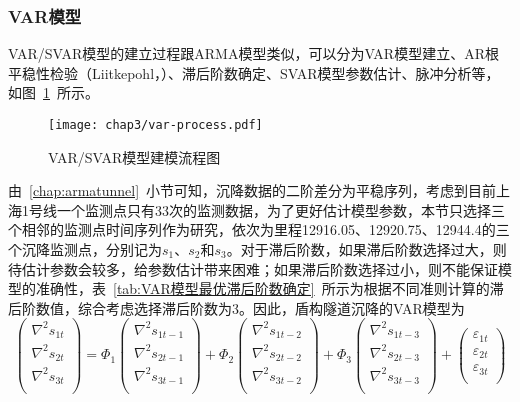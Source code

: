 \subsubsection{VAR模型}

VAR/SVAR模型的建立过程跟ARMA模型类似，可以分为VAR模型建立、AR根平稳性检验（Liitkepohl，\citeyear{liitkepohl1991introduction}）、滞后阶数确定、SVAR模型参数估计、脉冲分析等，如图~\ref{fig:VARSVAR模型建模流程图}~所示。

\begin{figure}[htb!]
    \centering
    \texttt{[image: chap3/var-process.pdf]}
    \caption{VAR/SVAR模型建模流程图}
    \label{fig:VARSVAR模型建模流程图}
\end{figure}

由~\ref{chap:armatunnel}~小节可知，沉降数据的二阶差分为平稳序列，考虑到目前上海1号线一个监测点只有33次的监测数据，为了更好估计模型参数，本节只选择三个相邻的监测点时间序列作为研究，依次为里程12916.05、12920.75、12944.4的三个沉降监测点，分别记为$s_1$、$s_2$和$s_3$。对于滞后阶数，如果滞后阶数选择过大，则待估计参数会较多，给参数估计带来困难；如果滞后阶数选择过小，则不能保证模型的准确性，表~\ref{tab:VAR模型最优滞后阶数确定}~所示为根据不同准则计算的滞后阶数值，综合考虑选择滞后阶数为3。因此，盾构隧道沉降的VAR模型为
\begin{equation}
	\label{equ:var}
	\left( \begin{matrix}
   {{\nabla }^{2}}{{s}_{1t}}  \\
   {{\nabla }^{2}}{{s}_{2t}}  \\
   {{\nabla }^{2}}{{s}_{3t}}  \\
\end{matrix} \right)={{\Phi }_{1}}\left( \begin{matrix}
   {{\nabla }^{2}}{{s}_{1t-1}}  \\
   {{\nabla }^{2}}{{s}_{2t-1}}  \\
   {{\nabla }^{2}}{{s}_{3t-1}}  \\
\end{matrix} \right)+{{\Phi }_{2}}\left( \begin{matrix}
   {{\nabla }^{2}}{{s}_{1t-2}}  \\
   {{\nabla }^{2}}{{s}_{2t-2}}  \\
   {{\nabla }^{2}}{{s}_{3t-2}}  \\
\end{matrix} \right)+{{\Phi }_{3}}\left( \begin{matrix}
   {{\nabla }^{2}}{{s}_{1t-3}}  \\
   {{\nabla }^{2}}{{s}_{2t-3}}  \\
   {{\nabla }^{2}}{{s}_{3t-3}}  \\
\end{matrix} \right)+\left( \begin{matrix}
   {{\varepsilon }_{1t}}  \\
   {{\varepsilon }_{2t}}  \\
   {{\varepsilon }_{3t}}  \\
\end{matrix} \right)
\end{equation}


